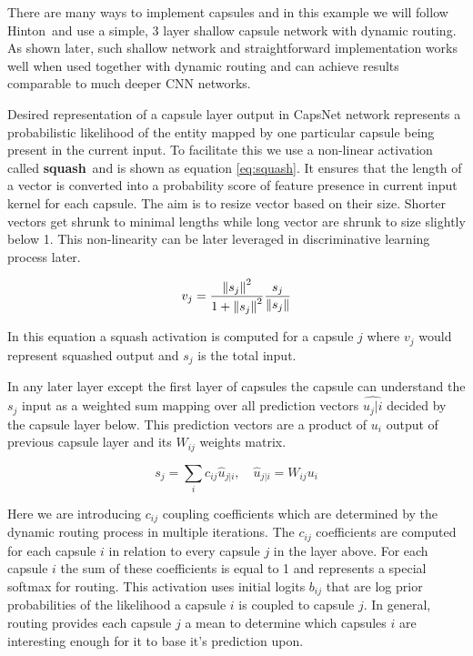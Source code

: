 There are many ways to implement capsules and in this example we will follow Hinton\,\cite{capsule} and use a simple, 3 layer shallow capsule network with dynamic routing. As shown later, such shallow network and straightforward implementation works well when used together with dynamic routing and can achieve results comparable to much deeper CNN networks.

Desired representation of a capsule layer output in CapsNet network represents a probabilistic likelihood of the entity mapped by one particular capsule being present in the current input. To facilitate this we use a non-linear activation called \textbf{squash}\ and is shown as equation \ref{eq:squash}. It ensures that the length of a vector is converted into a probability score of feature presence in current input kernel for each capsule. The aim is to resize vector based on their size. Shorter vectors get shrunk to minimal lengths while long vector are shrunk to size slightly below 1. This non-linearity can be later leveraged in discriminative learning process later.

\begin{equation}
    v_j = \frac{\left\lVert s_j \right\rVert^2}{1 + \left\lVert s_j \right\rVert^2} \frac{s_j}{\left\lVert s_j \right\rVert}
    \label{eq:squash}
\end{equation}

In this equation a squash activation is computed for a capsule $j$ where $v_j$ would represent squashed output and $s_j$ is the total input.

In any later layer except the first layer of capsules the capsule can understand the $s_j$ input as a weighted sum mapping over all prediction vectors $\hat{u_j|i}$ decided by the capsule layer below. This prediction vectors are a product of $u_i$ output of previous capsule layer and its $W_{ij}$ weights matrix.

\begin{equation}
    s_j = \sum_{i}c_{ij}\hat{u}_{j|i},\quad \hat{u}_{j|i} = W_{ij}u_i
\end{equation}

Here we are introducing $c_{ij}$ coupling coefficients which are determined by the dynamic routing process in multiple iterations. The $c_{ij}$ coefficients are computed for each capsule $i$ in relation to every capsule $j$ in the layer above. For each capsule $i$ the sum of these coefficients is equal to 1 and represents a special softmax for routing. This activation uses initial logits $b_{ij}$ that are log prior probabilities of the likelihood a capsule $i$ is coupled to capsule $j$. In general, routing provides each capsule $j$ a mean to determine which capsules $i$ are interesting enough for it to base it's prediction upon.

